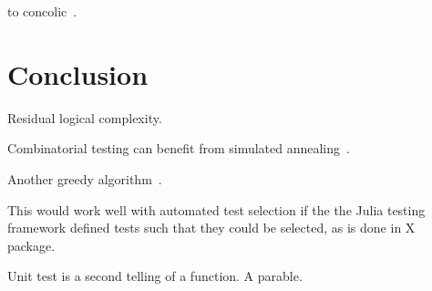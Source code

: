 \documentclass{juliacon}
\begin{document}
\vskip 6pt
to concolic~\cite{King1976-jt,Wang2018-xh}.


\section{Conclusion}
Residual logical complexity.

Combinatorial testing can benefit from simulated annealing~\cite{Petke2015-ex}.

Another greedy algorithm~\cite{Calvagna2012-ic,Koc2018-vs}.

This would work well with automated test selection if the the Julia testing framework defined tests such that they could be selected, as is done in X package.


\vskip 6pt
Unit test is a second telling of a function. A parable.


\end{document}
